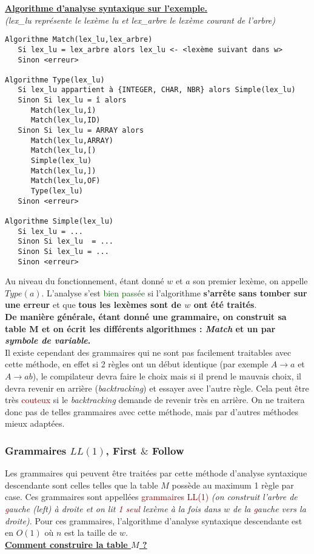 \documentclass{article}
\newcommand{\gre}[1]{\textcolor{darkgreen}{#1}}
\newcommand{\red}[1]{\textcolor{darkred}{#1}}
\newcommand{\stitre}[1]{\noindent\textbf{\underline{#1}}}
\begin{document}
\stitre{Algorithme d'analyse syntaxique sur l'exemple.} \\\textit{(lex\_lu représente le lexème lu et lex\_arbre le lexème courant de l'arbre)}
\begin{verbatim}
Algorithme Match(lex_lu,lex_arbre)
   Si lex_lu = lex_arbre alors lex_lu <- <lexème suivant dans w>
   Sinon <erreur>
   
Algorithme Type(lex_lu)
   Si lex_lu appartient à {INTEGER, CHAR, NBR} alors Simple(lex_lu)
   Sinon Si lex_lu = î alors
      Match(lex_lu,î)
      Match(lex_lu,ID)
   Sinon Si lex_lu = ARRAY alors
      Match(lex_lu,ARRAY)
      Match(lex_lu,[)
      Simple(lex_lu)
      Match(lex_lu,])
      Match(lex_lu,OF)
      Type(lex_lu)
   Sinon <erreur>

Algorithme Simple(lex_lu)
   Si lex_lu = ...
   Sinon Si lex_lu  = ...
   Sinon Si lex_lu = ...
   Sinon <erreur>
\end{verbatim}

\noindent Au niveau du fonctionnement, étant donné $w$ et $a$ son premier lexème, on appelle $Type(a)$. L'analyse s'est \gre{bien passée} si l'algorithme \textbf{s'arrête sans 
tomber sur une erreur} et que \textbf{tous les lexèmes sont de $w$ ont été traités}. \\

\noindent \textbf{De manière générale, étant donné une grammaire, on construit sa table M et on écrit les différents algorithmes : \textit{Match} et un par \textit{symbole de 
variable}.} \\

\noindent Il existe cependant des grammaires qui ne sont pas facilement traitables avec cette méthode, en effet si 2 règles ont un début identique (par exemple $A \rightarrow 
a$ et $A \rightarrow ab$), le compilateur devra faire le choix mais si il prend le mauvais choix, il devra revenir en arrière (\textit{backtracking}) et essayer avec l'autre règle. 
Cela peut être très \red{couteux} si le \textit{backtracking} demande de revenir très en arrière. On ne traitera donc pas de telles grammaires avec cette méthode, mais par 
d'autres méthodes mieux adaptées.

\subsubsection{Grammaires $LL(1)$, First $\&$ Follow}

Les grammaires qui peuvent être traitées par cette méthode d'analyse syntaxique descendante sont celles telles que la table $M$ possède au maximum 1 règle par case. Ces 
grammaires sont appellées \red{grammaires LL(1)} \textit{(on construit l'arbre de \red{g}auche (left) à droite et on lit \red{1 seul} lexème à la fois dans $w$ de la \red{g}auche 
vers la droite).} Pour ces grammaires, l'algorithme d'analyse syntaxique descendante est en $O(1)$ où $n$ est la taille de $w$. \\
\newpage
\stitre{Comment construire la table $M$ ?}
\end{document}
